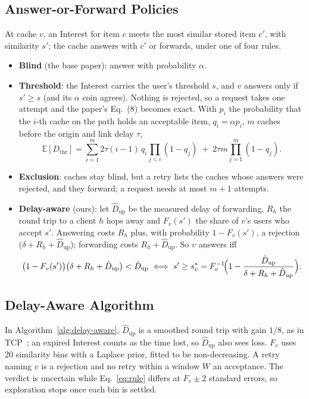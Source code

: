 \documentclass[11pt,a4paper]{article}
\newcommand{\Dup}{\hat{D}_{\mathrm{up}}}
\begin{document}
\subsection{Answer-or-Forward Policies}\label{sec:policies}
At cache $v$, an Interest for item $c$ meets the most similar stored item $c'$, with similarity
$s'$; the cache answers with $c'$ or forwards, under one of four rules.
\begin{itemize}
  \item \textbf{Blind} (the base paper): answer with probability $\alpha$.
  \item \textbf{Threshold}: the Interest carries the user's threshold $s$, and $v$ answers only if
        $s' \ge s$ (and its $\alpha$ coin agrees). Nothing is rejected, so a request takes one
        attempt and the paper's Eq.~(8) becomes exact. With $p_i$ the probability that the $i$-th
        cache on the path holds an acceptable item, $q_i = \alpha p_i$, $m$ caches before the
        origin and link delay $\tau$,
        \begin{equation}
          \mathbb{E}[D_{\mathrm{thr}}] = \sum_{i=1}^{m} 2\tau(i-1)\,q_i\prod_{j<i}(1-q_j)
          \;+\; 2\tau m\prod_{j=1}^{m}(1-q_j).
          \label{eq:threshold}
        \end{equation}
  \item \textbf{Exclusion}: caches stay blind, but a retry lists the caches whose answers were
        rejected, and they forward; a request needs at most $m+1$ attempts.
  \item \textbf{Delay-aware} (ours): let $\Dup$ be the measured delay of forwarding, $R_h$ the round
        trip to a client $h$ hops away and $F_v(s')$ the share of $v$'s users who accept $s'$.
        Answering costs $R_h$ plus, with probability $1-F_v(s')$, a rejection
        ($\delta + R_h + \Dup$); forwarding costs $R_h + \Dup$. So $v$ answers iff
        \begin{equation}
          \bigl(1-F_v(s')\bigr)\bigl(\delta + R_h + \Dup\bigr) < \Dup
          \iff
          s' \ge s^{*}_v = F_v^{-1}\!\Bigl(1 - \frac{\Dup}{\delta + R_h + \Dup}\Bigr).
          \label{eq:rule}
        \end{equation}
\end{itemize}

\subsection{Delay-Aware Algorithm}\label{sec:algo}
In Algorithm~\ref{alg:delay-aware}, $\Dup$ is a smoothed round trip with gain $1/8$, as in
TCP~\cite{jacobson1988congestion,paxson2011rfc6298}; an expired Interest counts as the time lost,
so $\Dup$ also sees loss. $F_v$ uses 20 similarity bins with a Laplace prior, fitted to be
non-decreasing. A retry naming $v$ is a rejection and no retry within a window $W$ an acceptance.
The verdict is uncertain while Eq.~\eqref{eq:rule} differs at $F_v \pm 2$ standard errors, so
exploration stops once each bin is settled.
\end{document}

